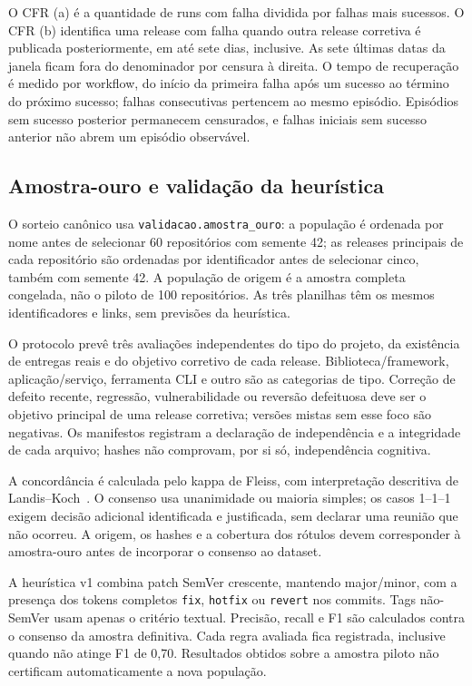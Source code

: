 O CFR (a) é a quantidade de runs com falha dividida por falhas mais sucessos.
O CFR (b) identifica uma release com falha quando outra release corretiva é
publicada posteriormente, em até sete dias, inclusive. As sete últimas datas da
janela ficam fora do denominador por censura à direita. O tempo de recuperação
é medido por workflow, do início da primeira falha após um sucesso ao término
do próximo sucesso; falhas consecutivas pertencem ao mesmo episódio. Episódios
sem sucesso posterior permanecem censurados, e falhas iniciais sem sucesso
anterior não abrem um episódio observável.

\subsection{Amostra-ouro e validação da heurística}

O sorteio canônico usa \texttt{validacao.amostra\_ouro}: a população é ordenada
por nome antes de selecionar 60 repositórios com semente 42; as releases principais
de cada repositório são ordenadas por identificador antes de selecionar cinco,
também com semente 42. A população de origem é a amostra completa congelada,
não o piloto de 100 repositórios. As três planilhas têm os mesmos identificadores
e links, sem previsões da heurística.

O protocolo prevê três avaliações independentes do tipo do projeto, da existência
de entregas reais e do objetivo corretivo de cada release. Biblioteca/framework,
aplicação/serviço, ferramenta CLI e outro são as categorias de tipo. Correção
de defeito recente, regressão, vulnerabilidade ou reversão defeituosa deve ser o
objetivo principal de uma release corretiva; versões mistas sem esse foco são
negativas. Os manifestos registram a declaração de independência e a integridade
de cada arquivo; hashes não comprovam, por si só, independência cognitiva.

A concordância é calculada pelo kappa de Fleiss, com interpretação descritiva de
Landis--Koch~\cite{landis1977measurement}. O consenso usa unanimidade ou maioria
simples; os casos 1--1--1 exigem decisão adicional identificada e justificada,
sem declarar uma reunião que não ocorreu. A origem, os hashes e a cobertura dos
rótulos devem corresponder à amostra-ouro antes de incorporar o consenso ao dataset.

A heurística v1 combina patch SemVer crescente, mantendo major/minor, com a
presença dos tokens completos \texttt{fix}, \texttt{hotfix} ou \texttt{revert}
nos commits. Tags não-SemVer usam apenas o critério textual. Precisão, recall e
F1 são calculados contra o consenso da amostra definitiva. Cada regra avaliada
fica registrada, inclusive quando não atinge F1 de 0,70. Resultados obtidos sobre
a amostra piloto não certificam automaticamente a nova população.

